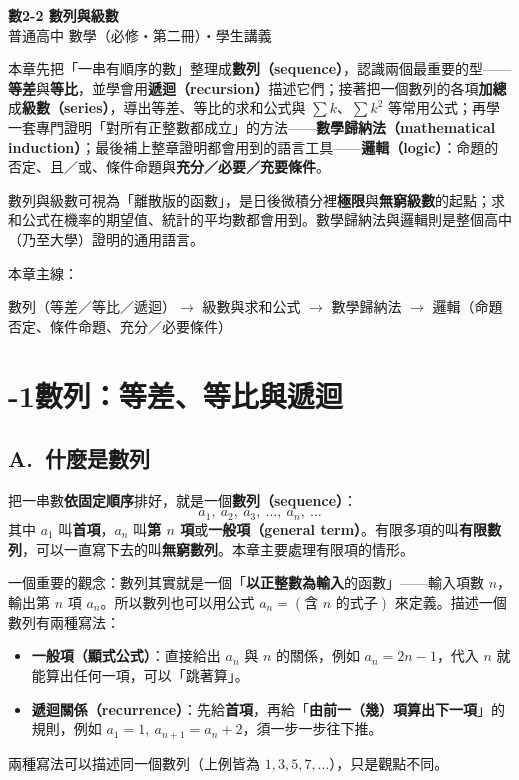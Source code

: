 \documentclass[11pt]{article}
\begin{document}
\begin{center}
{\sffamily\Huge\bfseries 數2-2 數列與級數}\\[3pt]
{\sffamily\large 普通高中 數學（必修・第二冊）・學生講義}
\end{center}
\vspace{0.6em}

本章先把「一串有順序的數」整理成\textbf{數列（sequence）}，認識兩個最重要的型——\textbf{等差}與\textbf{等比}，並學會用\textbf{遞迴（recursion）}描述它們；接著把一個數列的各項\textbf{加總}成\textbf{級數（series）}，導出等差、等比的求和公式與 $\sum k$、$\sum k^2$ 等常用公式；再學一套專門證明「對所有正整數都成立」的方法——\textbf{數學歸納法（mathematical induction）}；最後補上整章證明都會用到的語言工具——\textbf{邏輯（logic）}：命題的否定、且／或、條件命題與\textbf{充分／必要／充要條件}。

數列與級數可視為「離散版的函數」，是日後微積分裡\textbf{極限}與\textbf{無窮級數}的起點；求和公式在機率的期望值、統計的平均數都會用到。數學歸納法與邏輯則是整個高中（乃至大學）證明的通用語言。

\medskip
本章主線：

\begin{center}
數列（等差／等比／遞迴）$\rightarrow$ 級數與求和公式 $\rightarrow$ 數學歸納法 $\rightarrow$ 邏輯（命題否定、條件命題、充分／必要條件）
\end{center}

\section*{-1\quad 數列：等差、等比與遞迴}

\subsection*{\sffamily A.\ 什麼是數列}

把一串數\textbf{依固定順序}排好，就是一個\textbf{數列（sequence）}：
$$
a_1,\ a_2,\ a_3,\ \dots,\ a_n,\ \dots
$$
其中 $a_1$ 叫\textbf{首項}，$a_n$ 叫\textbf{第 $n$ 項}或\textbf{一般項（general term）}。有限多項的叫\textbf{有限數列}，可以一直寫下去的叫\textbf{無窮數列}。本章主要處理有限項的情形。

一個重要的觀念：數列其實就是一個「\textbf{以正整數為輸入}的函數」——輸入項數 $n$，輸出第 $n$ 項 $a_n$。所以數列也可以用公式 $a_n=(\text{含 }n\text{ 的式子})$ 來定義。描述一個數列有兩種寫法：

\begin{itemize}\setlength{\itemsep}{2pt}
\item \textbf{一般項（顯式公式）}：直接給出 $a_n$ 與 $n$ 的關係，例如 $a_n=2n-1$，代入 $n$ 就能算出任何一項，可以「跳著算」。
\item \textbf{遞迴關係（recurrence）}：先給\textbf{首項}，再給「\textbf{由前一（幾）項算出下一項}」的規則，例如 $a_1=1,\ a_{n+1}=a_n+2$，須一步一步往下推。
\end{itemize}
兩種寫法可以描述同一個數列（上例皆為 $1,3,5,7,\dots$），只是觀點不同。
\end{document}
